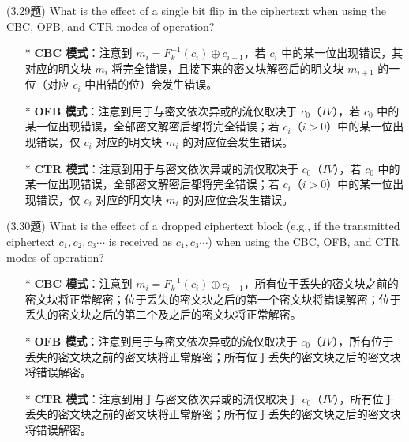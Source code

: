 \begin{questions}
    \question (3.29题) What is the effect of a single bit flip in the ciphertext when using the CBC, OFB, and CTR modes of operation?

        \begin{solution}
            \begin{enumerate}
                \item[*] \textbf{CBC 模式}：注意到 $m_i=F_k^{-1}(c_i)\oplus{c_{i-1}}$，若 $c_i$ 中的某一位出现错误，其对应的明文块 $m_i$ 将完全错误，且接下来的密文块解密后的明文块 $m_{i+1}$ 的一位（对应 $c_i$ 中出错的位）会发生错误。
                \item[*] \textbf{OFB 模式}：注意到用于与密文依次异或的流仅取决于 $c_0$（$IV$），若 $c_0$ 中的某一位出现错误，全部密文解密后都将完全错误；若 $c_i$（$i>0$）中的某一位出现错误，仅 $c_i$ 对应的明文块 $m_i$ 的对应位会发生错误。
                \item[*] \textbf{CTR 模式}：注意到用于与密文依次异或的流仅取决于 $c_0$（$IV$），若 $c_0$ 中的某一位出现错误，全部密文解密后都将完全错误；若 $c_i$（$i>0$）中的某一位出现错误，仅 $c_i$ 对应的明文块 $m_i$ 的对应位会发生错误。
            \end{enumerate}
        \end{solution}

    \question (3.30题) What is the effect of a dropped ciphertext block (e.g., if the transmitted ciphertext $c_1,c_2,c_3\cdots$ is received as $c_1,c_3\cdots$) when using the CBC, OFB, and CTR modes of operation?

        \begin{solution}
            \begin{enumerate}
                \item[*] \textbf{CBC 模式}：注意到 $m_i=F_k^{-1}(c_i)\oplus{c_{i-1}}$，所有位于丢失的密文块之前的密文块将正常解密；位于丢失的密文块之后的第一个密文块将错误解密；位于丢失的密文块之后的第二个及之后的密文块将正常解密。
                \item[*] \textbf{OFB 模式}：注意到用于与密文依次异或的流仅取决于 $c_0$（$IV$），所有位于丢失的密文块之前的密文块将正常解密；所有位于丢失的密文块之后的密文块将错误解密。
                \item[*] \textbf{CTR 模式}：注意到用于与密文依次异或的流仅取决于 $c_0$（$IV$），所有位于丢失的密文块之前的密文块将正常解密；所有位于丢失的密文块之后的密文块将错误解密。
            \end{enumerate}
        \end{solution}

\end{questions}



